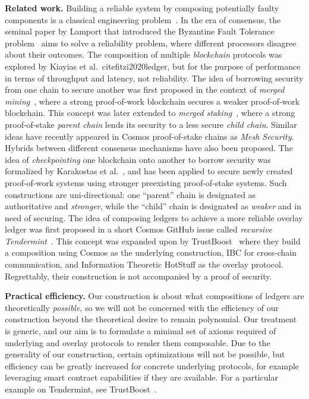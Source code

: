 \noindent
\textbf{Related work.} Building a reliable system by composing potentially faulty components
is a classical engineering problem~\cite{von1956probabilistic,moore1956reliable}.
In the era of consensus, the seminal
paper by Lamport that introduced the Byzantine Fault Tolerance problem~\cite{shostak1982byzantine}
aims to solve a reliability problem, where different processors disagree about their
outcomes. The composition of multiple \emph{blockchain} protocols was explored by
Kiayias et al.~cite{fitzi2020ledger}, but for the purpose of performance in terms of throughput
and latency, not reliability. The idea of borrowing security from one chain to
secure another was first proposed in the context of \emph{merged mining}~\cite{namecoin}, where
a strong proof-of-work blockchain secures a weaker proof-of-work blockchain. This
concept was later extended to \emph{merged staking}~\cite{pos-sidechains}, where a
strong proof-of-stake \emph{parent chain} lends its security to a less secure
\emph{child chain}. Similar ideas have recently appeared in Cosmos proof-of-stake
chains as \emph{Mesh Security}. Hybrids between different consensus mechanisms
have also been proposed. The idea of \emph{checkpointing}
one blockchain onto another to borrow security was formalized by Karakostas et al.~\cite{karakostas2021securing},
and has been applied to secure newly created proof-of-work systems using stronger
preexisting proof-of-stake systems. Such constructions are uni-directional:
one ``parent'' chain is designated as authoritative and \emph{stronger},
while the ``child'' chain is designated as \emph{weaker} and in need of securing.
The idea of composing ledgers to achieve a more reliable overlay ledger
was first proposed in a short Cosmos GitHub issue called
\emph{recursive Tendermint}~\cite{recursive-tendermint}.
This concept was expanded upon by TrustBoost~\cite{trustboost}
where they build a composition using Cosmos as the underlying
construction, IBC for cross-chain communication, and Information Theoretic
HotStuff as the overlay protocol. Regrettably, their construction is not
accompanied by a proof of security.

\noindent
\textbf{Practical efficiency.}
Our construction is about what compositions of ledgers are theoretically \emph{possible},
so we will not be concerned with the efficiency of our construction beyond the
theoretical desire to remain polynomial. Our treatment
is generic, and our aim is to formulate a minimal set of axioms
required of underlying and overlay protocols to render them composable.
Due to the generality of our construction, certain optimizations will not be
possible, but efficiency can be greatly increased for concrete underlying
protocols, for example leveraging smart contract capabilities if they are
available. For a particular example on Tendermint, see TrustBoost~\cite{trustboost}.

